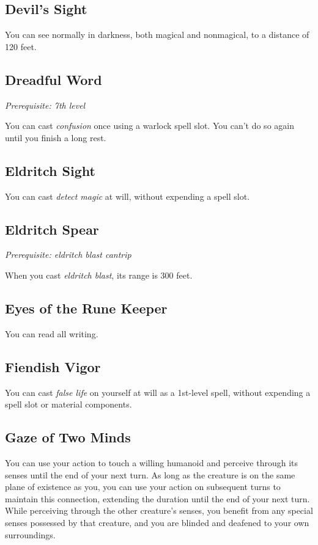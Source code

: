 \subsection{Devil's Sight}

You can see normally in darkness, both magical and nonmagical, to a distance of 120 feet.

\subsection{Dreadful Word}

\textit{Prerequisite: 7th level}

You can cast \textit{confusion} once using a warlock spell slot. You can't do so again until you finish a long rest.

\subsection{Eldritch Sight}

You can cast \textit{detect magic} at will, without expending a spell slot.

\subsection{Eldritch Spear}

\textit{Prerequisite: eldritch blast cantrip}

When you cast \textit{eldritch blast}, its range is 300 feet.

\subsection{Eyes of the Rune Keeper}

You can read all writing.

\subsection{Fiendish Vigor}

You can cast \textit{false life} on yourself at will as a 1st-level spell, without expending a spell slot or material components.

\subsection{Gaze of Two Minds}

You can use your action to touch a willing humanoid and perceive through its senses until the end of your next turn. As long as the creature is on the same plane of existence as you, you can use your action on subsequent turns to maintain this connection, extending the duration until the end of your next turn. While perceiving through the other creature's senses, you benefit from any special senses possessed by that creature, and you are blinded and deafened to your own surroundings.

